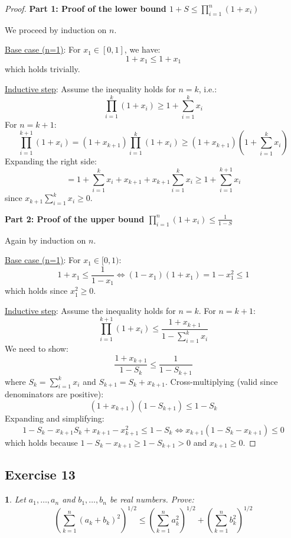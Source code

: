 \documentclass[12pt]{article}
\newtheorem{problem}{}
\begin{document}
\begin{proof}
\textbf{Part 1: Proof of the lower bound \( 1 + S \leq \prod_{i=1}^n (1 + x_i) \)}

We proceed by induction on \( n \).

\underline{Base case (n=1)}: 
For \( x_1 \in [0,1] \), we have:
\[
1 + x_1 \leq 1 + x_1
\]
which holds trivially.

\underline{Inductive step}: 
Assume the inequality holds for \( n = k \), i.e.:
\[
\prod_{i=1}^k (1 + x_i) \geq 1 + \sum_{i=1}^k x_i
\]
For \( n = k+1 \):
\[
\prod_{i=1}^{k+1} (1 + x_i) = (1 + x_{k+1})\prod_{i=1}^k (1 + x_i) \geq (1 + x_{k+1})\left(1 + \sum_{i=1}^k x_i\right)
\]
Expanding the right side:
\[
= 1 + \sum_{i=1}^k x_i + x_{k+1} + x_{k+1}\sum_{i=1}^k x_i \geq 1 + \sum_{i=1}^{k+1} x_i
\]
since \( x_{k+1}\sum_{i=1}^k x_i \geq 0 \).

\textbf{Part 2: Proof of the upper bound \( \prod_{i=1}^n (1 + x_i) \leq \frac{1}{1 - S} \)}

Again by induction on \( n \).

\underline{Base case (n=1)}: 
For \( x_1 \in [0,1) \):
\[
1 + x_1 \leq \frac{1}{1 - x_1} \iff (1 - x_1)(1 + x_1) = 1 - x_1^2 \leq 1
\]
which holds since \( x_1^2 \geq 0 \).

\underline{Inductive step}: 
Assume the inequality holds for \( n = k \). For \( n = k+1 \):
\[
\prod_{i=1}^{k+1} (1 + x_i) \leq \frac{1 + x_{k+1}}{1 - \sum_{i=1}^k x_i}
\]
We need to show:
\[
\frac{1 + x_{k+1}}{1 - S_k} \leq \frac{1}{1 - S_{k+1}}
\]
where \( S_k = \sum_{i=1}^k x_i \) and \( S_{k+1} = S_k + x_{k+1} \). Cross-multiplying (valid since denominators are positive):
\[
(1 + x_{k+1})(1 - S_{k+1}) \leq 1 - S_k
\]
Expanding and simplifying:
\[
1 - S_k - x_{k+1}S_k + x_{k+1} - x_{k+1}^2 \leq 1 - S_k \iff x_{k+1}(1 - S_k - x_{k+1}) \leq 0
\]
which holds because \( 1 - S_k - x_{k+1} \geq 1 - S_{k+1} > 0 \) and \( x_{k+1} \geq 0 \).


\end{proof}


\subsection*{Exercise 13}
\begin{problem}
Let \( a_1, \ldots, a_n \) and \( b_1, \ldots, b_n \) be real numbers. Prove:
\[
\left( \sum_{k=1}^n (a_k + b_k)^2 \right)^{1/2} \leq \left( \sum_{k=1}^n a_k^2 \right)^{1/2} + \left( \sum_{k=1}^n b_k^2 \right)^{1/2}
\]
\end{problem}
\end{document}
